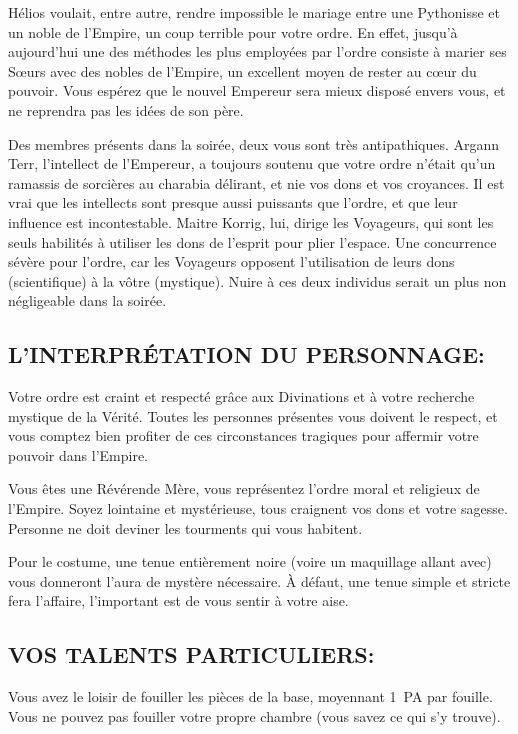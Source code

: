 \documentclass[14pt,twocolumn]{extarticle}
\begin{document}
Hélios voulait, entre autre, rendre impossible le mariage entre une Pythonisse
et un noble de l'Empire, un coup terrible pour votre ordre. En effet, jusqu'à
aujourd'hui une des méthodes les plus employées par l'ordre consiste à marier
ses Sœurs avec des nobles de l'Empire, un excellent moyen de rester au
cœur du pouvoir. Vous espérez que le nouvel Empereur sera mieux disposé
envers vous, et ne reprendra pas les idées de son père.

Des membres présents dans la soirée, deux vous sont très antipathiques. Argann
Terr, l'intellect de l'Empereur, a toujours soutenu que votre ordre n'était
\og qu'un ramassis de sorcières au charabia délirant\fg{}, et nie vos dons et
vos croyances. Il est vrai que les intellects sont presque aussi puissants que
l'ordre, et que leur influence est incontestable. Maitre Korrig, lui, dirige
les Voyageurs, qui sont les seuls habilités à utiliser les dons de l'esprit
pour plier l'espace. Une concurrence sévère pour l'ordre, car les Voyageurs
opposent l'utilisation de leurs dons (scientifique) à la vôtre (mystique).
Nuire à ces deux individus serait un plus non négligeable dans la soirée.

\subsection{L'INTERPRÉTATION DU PERSONNAGE:}

Votre ordre est craint et respecté grâce aux Divinations et à votre recherche
mystique de la Vérité. Toutes les personnes présentes vous doivent le respect,
et vous comptez bien profiter de ces circonstances tragiques pour affermir
votre pouvoir dans l'Empire.

Vous êtes une Révérende Mère, vous représentez l'ordre moral et religieux
de l'Empire. Soyez lointaine et mystérieuse, tous craignent vos dons et votre
sagesse. Personne ne doit deviner les tourments qui vous habitent.

Pour le costume, une tenue entièrement noire (voire un maquillage allant avec)
vous donneront l'aura de mystère nécessaire. À défaut, une tenue simple et
stricte fera l'affaire, l'important est de vous sentir à votre aise.

\subsection{VOS TALENTS PARTICULIERS:}

Vous avez le loisir de fouiller les pièces de la base, moyennant 1~PA par
fouille. Vous ne pouvez pas fouiller votre propre chambre (vous savez ce qui
s'y trouve).
\end{document}
